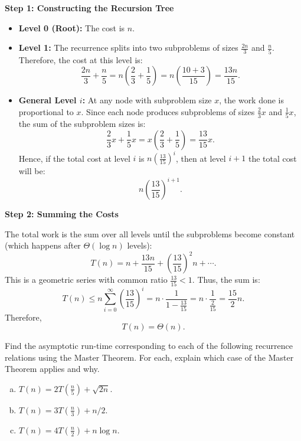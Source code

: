 \documentclass[11pt]{article}
\begin{document}
    \textbf{Step 1: Constructing the Recursion Tree}

    \begin{itemize}
        \item \textbf{Level 0 (Root):} The cost is \( n \).
        \item \textbf{Level 1:} The recurrence splits into two subproblems of sizes \(\frac{2n}{3}\) and \(\frac{n}{5}\). 
        Therefore, the cost at this level is:
        \[
        \frac{2n}{3} + \frac{n}{5} = n\left(\frac{2}{3} + \frac{1}{5}\right)
        = n\left(\frac{10+3}{15}\right)
        = \frac{13n}{15}.
        \]
        \item \textbf{General Level \(i\):} At any node with subproblem size \( x \), the work done is proportional to \( x \). 
        Since each node produces subproblems of sizes \(\frac{2}{3}x\) and \(\frac{1}{5}x\), the sum of the subproblem sizes is:
        \[
        \frac{2}{3}x+\frac{1}{5}x = x\left(\frac{2}{3}+\frac{1}{5}\right)
        = \frac{13}{15}x.
        \]
        Hence, if the total cost at level \(i\) is \( n\left(\frac{13}{15}\right)^i \), then at level \(i+1\) the total cost will be:
        \[
        n\left(\frac{13}{15}\right)^{i+1}.
        \]
    \end{itemize}

    \textbf{Step 2: Summing the Costs}

    The total work is the sum over all levels until the subproblems become constant (which happens after \( \Theta(\log n) \) levels):
    \[
    T(n) = n + \frac{13n}{15} + \left(\frac{13}{15}\right)^2 n + \cdots.
    \]
    This is a geometric series with common ratio \( \frac{13}{15} < 1 \). Thus, the sum is:
    \[
    T(n) \le n \sum_{i=0}^{\infty}\left(\frac{13}{15}\right)^i
    = n \cdot \frac{1}{1-\frac{13}{15}}
    = n \cdot \frac{1}{\frac{2}{15}}
    = \frac{15}{2}n.
    \]
    Therefore,
    \[
    T(n) = \Theta(n).
    \]
    
    \newpage
    
    \begin{tcolorbox}[title={Problem 1C (12 pts)}]
        Find the asymptotic run-time corresponding to each of the following recurrence relations using the Master Theorem. For each, explain which case of the Master Theorem applies and why.
        \begin{enumerate}[(a)]
            \item $T(n) = 2T(\frac{n}{5}) + \sqrt{2n}$.
            \item $T(n) = 3T(\frac{n}{3}) + n/2$.
            \item $T(n) = 4T(\frac{n}{2}) + n\log n$.
        \end{enumerate}
    \end{tcolorbox}
\end{document}
